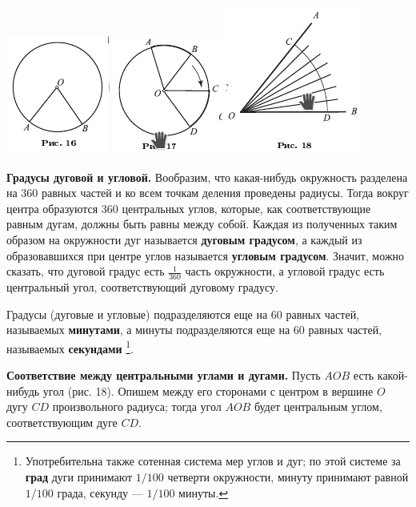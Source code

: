 \documentclass[oneside]{book}
\begin{document}
\includegraphics{pics/ris-16}
\includegraphics{pics/ris-17}
\includegraphics{pics/ris-18}

\textbf{Градусы дуговой и угловой.}
Вообразим, что какая-нибудь окружность разделена на 360 равных частей и ко всем точкам деления проведены радиусы.
Тогда вокруг центра образуются 360 центральных углов, которые, как соответствующие равным дугам, должны быть равны между собой.
Каждая из полученных таким образом на окружности дуг называется \textbf{дуговым градусом}, а каждый из образовавшихся при центре углов называется \textbf{угловым градусом}.
Значит, можно сказать, что дуговой градус есть $\tfrac1{360}$ часть окружности, а угловой градус есть центральный угол, соответствующий дуговому градусу.

Градусы (дуговые и угловые) подразделяются еще на 60 равных частей, называемых \textbf{минутами}, а минуты подразделяются еще на 60 равных частей, называемых \textbf{секундами}%
\footnote{Употребительна также сотенная система мер углов и дуг;
по этой системе за \textbf{град} дуги принимают $1/100$ четверти окружности, минуту принимают равной $1/100$ града, секунду — $1/100$ минуты.}.


\textbf{Соответствие между центральными углами и дугами.}
Пусть $AOB$ есть какой-нибудь угол (рис. 18).
Опишем между его сторонами с центром в вершине $O$ дугу $CD$ произвольного радиуса;
тогда угол $AOB$ будет центральным углом, соответствующим дуге $CD$.
\end{document}
